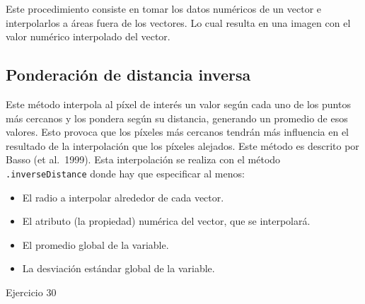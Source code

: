 \documentclass[
  12pt,
  letterpaper,
  twoside]{book}
\providecommand{\tightlist}{%
  \setlength{\itemsep}{0pt}\setlength{\parskip}{0pt}}
\begin{document}
Este procedimiento consiste en tomar los datos numéricos de un vector e interpolarlos a áreas fuera de los vectores. Lo cual resulta en una imagen con el valor numérico interpolado del vector.

\hypertarget{ponderaciuxf3n-de-distancia-inversa}{%
\subsection{Ponderación de distancia inversa}\label{ponderaciuxf3n-de-distancia-inversa}}

Este método interpola al píxel de interés un valor según cada uno de los puntos más cercanos y los pondera según su distancia, generando un promedio de esos valores. Esto provoca que los píxeles más cercanos tendrán más influencia en el resultado de la interpolación que los píxeles alejados. Este método es descrito por Basso (et al.~1999). Esta interpolación se realiza con el método \texttt{.inverseDistance} donde hay que especificar al menos:

\begin{itemize}
\tightlist
\item
  El radio a interpolar alrededor de cada vector.
\item
  El atributo (la propiedad) numérica del vector, que se interpolará.
\item
  El promedio global de la variable.
\item
  La desviación estándar global de la variable.
\end{itemize}

Ejercicio 30
\end{document}
